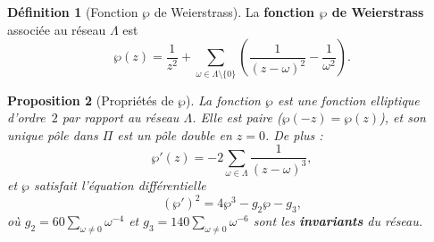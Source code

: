 \documentclass[12pt,a4paper,openany]{book}
\theoremstyle{definition}
\newtheorem{definition}{Définition}[chapter]
\theoremstyle{plain}
\newtheorem{proposition}[definition]{Proposition}
\theoremstyle{remark}
\begin{document}
\begin{definition}[Fonction $\wp$ de Weierstrass]\label{def:weierstrass-p}
La \textbf{fonction $\wp$ de Weierstrass} associée au réseau $\Lambda$ est
\[
  \wp(z) = \frac{1}{z^2} + \sum_{\omega \in \Lambda \setminus \{0\}}
  \left(\frac{1}{(z - \omega)^2} - \frac{1}{\omega^2}\right).
\]
\end{definition}

\begin{proposition}[Propriétés de $\wp$]\label{prop:weierstrass-p}
La fonction $\wp$ est une fonction elliptique d'ordre~$2$ par rapport au
réseau $\Lambda$. Elle est paire ($\wp(-z) = \wp(z)$), et son unique pôle dans
$\Pi$ est un pôle double en $z = 0$. De plus :
\[
  \wp'(z) = -2 \sum_{\omega \in \Lambda} \frac{1}{(z - \omega)^3},
\]
et $\wp$ satisfait l'équation différentielle
\begin{equation}\label{eq:weierstrass-ode}
  (\wp')^2 = 4\wp^3 - g_2 \wp - g_3,
\end{equation}
où $g_2 = 60 \sum_{\omega \neq 0} \omega^{-4}$ et
$g_3 = 140 \sum_{\omega \neq 0} \omega^{-6}$ sont les \textbf{invariants}
du réseau.
\end{proposition}

\begin{center}
\end{center}
\end{document}
